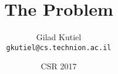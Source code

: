 \title{The \MCM{} Problem}
\author{
Gilad Kutiel 
\texorpdfstring{\\
\texttt{gkutiel@cs.technion.ac.il}
}{}}
\date{CSR 2017}
